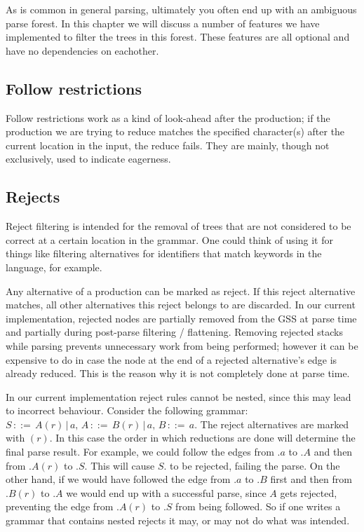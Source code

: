 \documentclass[a4paper,10pt]{article}
\begin{document}
As is common in general parsing, ultimately you often end up with an ambiguous parse forest. In this chapter we will discuss a number of features we have implemented to filter the trees in this forest. These features are all optional and have no dependencies on eachother.

\subsection{Follow restrictions}

Follow restrictions work as a kind of look-ahead after the production; if the production we are trying to reduce matches the specified character(s) after the current location in the input, the reduce fails. They are mainly, though not exclusively, used to indicate eagerness.

\subsection{Rejects}

Reject filtering is intended for the removal of trees that are not considered to be correct at a certain location in the grammar. One could think of using it for things like filtering alternatives for identifiers that match keywords in the language, for example.

Any alternative of a production can be marked as reject. If this reject alternative matches, all other alternatives this reject belongs to are discarded. In our current implementation, rejected nodes are partially removed from the GSS at parse time and partially during post-parse filtering / flattening. Removing rejected stacks while parsing prevents unnecessary work from being performed; however it can be expensive to do in case the node at the end of a rejected alternative's edge is already reduced. This is the reason why it is not completely done at parse time.

In our current implementation reject rules cannot be nested, since this may lead to incorrect behaviour. Consider the following grammar: $S\,::=\,A(r)\,|\,a,\,A\,::=\,B(r)\,|\,a,\,B\,::=\,a$. The reject alternatives are marked with $(r)$. In this case the order in which reductions are done will determine the final parse result. For example, we could follow the edges from $.a$ to $.A$ and then from $.A(r)$ to $.S$. This will cause $S.$ to be rejected, failing the parse. On the other hand, if we would have followed the edge from $.a$ to $.B$ first and then from $.B(r)$ to $.A$ we would end up with a successful parse, since $A$ gets rejected, preventing the edge from $.A(r)$ to $.S$ from being followed. So if one writes a grammar that contains nested rejects it may, or may not do what was intended.
\end{document}
